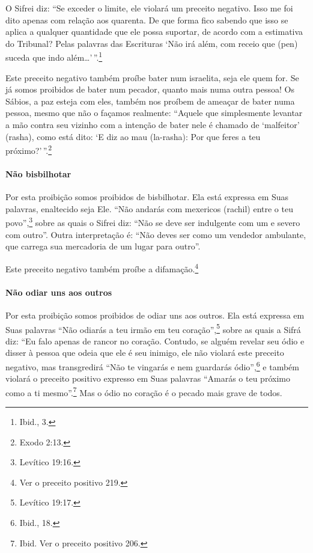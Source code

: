 O Sifrei diz: ``Se exceder o limite, ele violará um preceito negativo.
Isso me foi dito apenas com relação aos quarenta. De que forma fico
sabendo que isso se aplica a qualquer quantidade que ele possa suportar,
de acordo com a estimativa do Tribunal? Pelas palavras das Escrituras
`Não irá além, com receio que (pen) suceda que indo além\ldots{}'\,''.\footnote{Ibid., 3.}

Este preceito negativo também proíbe bater num israelita, seja ele quem
for. Se já somos proibidos de bater num pecador, quanto mais numa outra
pessoa! Os Sábios, a paz esteja com eles, também nos proíbem de ameaçar
de bater numa pessoa, mesmo que não o façamos realmente: ``Aquele que
simplesmente levantar a mão contra seu vizinho com a intenção de bater
nele é chamado de `malfeitor' (rasha), como está dito: `E diz ao mau
(la-rasha): Por que feres a teu próximo?'\,''.\footnote{Exodo 2:13.}

\paragraph{Não bisbilhotar}

Por esta proibição somos proibidos de bisbilhotar. Ela está expressa em
Suas palavras, enaltecido seja Ele. ``Não andarás com mexericos (rachil)
entre o teu povo'',\footnote{Levítico 19:16.} sobre as quais o Sifrei diz: ``Não
se deve ser indulgente com um e severo com outro''. Outra interpretação
é: ``Não deves ser como um vendedor ambulante, que carrega sua
mercadoria de um lugar para outro''.

Este preceito negativo também proíbe a difamação.\footnote{Ver o preceito positivo 219.}

\paragraph{Não odiar uns aos outros}

Por esta proibição somos proibidos de odiar uns aos outros. Ela está
expressa em Suas palavras ``Não odiarás a teu irmão em teu coração'',\footnote{Levítico 19:17.} sobre as quais a Sifrá diz: ``Eu falo apenas de rancor
no coração. Contudo, se alguém revelar seu ódio e
disser à pessoa que odeia que ele é seu inimigo, ele não violará este
preceito negativo, mas transgredirá ``Não te vingarás e nem guardarás
ódio'',\footnote{Ibid., 18.} e também violará o preceito positivo expresso em
Suas palavras ``Amarás o teu próximo como a ti mesmo''.\footnote{Ibid. Ver o preceito positivo 206.} Mas o ódio no coração é o pecado mais grave de todos.

